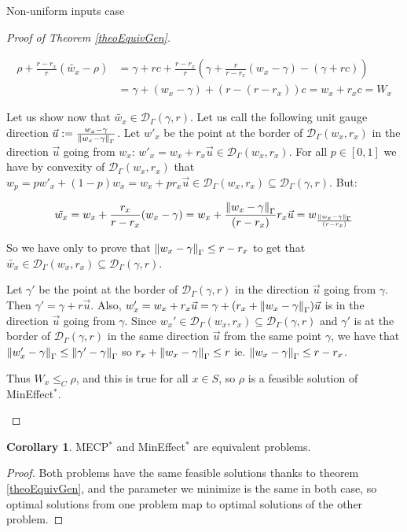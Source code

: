 \documentclass{article}
\theoremstyle{definition}
\newtheorem{cor}[theo]{Corollary}
\theoremstyle{remark}
\begin{document}
\begin{subsubsection}{Non-uniform inputs case}
\begin{proof}[Proof of Theorem \ref{theoEquivGen}]
\begin{enumerate}
      \begin{equation}
        \begin{aligned}
          \rho+ \frac{r-r_x}{r}(\tilde{w_x}-\rho) &=\gamma+ rc + \frac{r-r_x}{r}(\gamma + \frac{r}{r-r_x}(w_x-\gamma) - (\gamma + rc))\\
          &=\gamma+(w_x-\gamma) + (r-(r-r_x))c = w_x + r_xc = W_x
        \end{aligned}
      \end{equation}
      
      
      Let us show now that $\tilde{w_x} \in \mathcal{D}_{\Gamma}(\gamma,r)$. Let us call the following unit gauge direction $\vec{u} := \frac{w_x-\gamma}{\norm{w_x-\gamma}_{\Gamma}}$. Let $w'_x$ be the point at the border of $\mathcal{D}_{\Gamma}(w_x,r_x)$ in the direction $\vec{u}$ going from $w_x$: $w'_x= w_x + r_x\vec{u} \in \mathcal{D}_{\Gamma}(w_x,r_x)$. For all $p \in [0,1]$ we have by convexity of $\mathcal{D}_{\Gamma}(w_x,r_x)$ that $w_p = pw'_x + (1-p)w_x = w_x+pr_x\vec{u} \in \mathcal{D}_{\Gamma}(w_x,r_x) \subseteq \mathcal{D}_{\Gamma}(\gamma,r)$. But:
      
      \[ \tilde{w_x} = w_x + \frac{r_x}{r-r_x}(w_x-\gamma) = w_x + \frac{\norm{w_x-\gamma}_{\Gamma}}{(r-r_x)}r_x\vec{u} = w_{\frac{\norm{w_x-\gamma}_{\Gamma}}{(r-r_x)}} \]
      
      So we have only to prove that $\norm{w_x-\gamma}_{\Gamma} \leq r-r_x$ to get that $\tilde{w_x} \in \mathcal{D}_{\Gamma}(w_x,r_x) \subseteq \mathcal{D}_{\Gamma}(\gamma,r)$.
      
      Let $\gamma'$ be the point at the border of $\mathcal{D}_{\Gamma}(\gamma,r)$ in the direction $\vec{u}$ going from $\gamma$. Then $\gamma' = \gamma+r\vec{u}$. Also, $w_x' = w_x + r_x\vec{u} = \gamma + (r_x+\norm{w_x-\gamma}_{\Gamma})\vec{u}$ is in the direction $\vec{u}$ going from $\gamma$. Since $w_x' \in \mathcal{D}_{\Gamma}(w_x,r_x) \subseteq \mathcal{D}_{\Gamma}(\gamma,r)$ and $\gamma'$ is at the border of $\mathcal{D}_{\Gamma}(\gamma,r)$ in the same direction $\vec{u}$ from the same point $\gamma$, we have that $\norm{w_x' - \gamma}_{\Gamma} \leq \norm{\gamma'-\gamma}_{\Gamma}$ so $r_x+\norm{w_x-\gamma}_{\Gamma} \leq r$ ie. $\norm{w_x-\gamma}_{\Gamma} \leq r-r_x$.
      
      Thus $W_x \leq_C \rho$, and this is true for all $x \in S$, so $\rho$ is a feasible solution of MinEffect$^*$.
    \end{enumerate}
  \end{proof}
  
  \begin{cor}
    MECP$^*$ and MinEffect$^*$ are equivalent problems.
  \end{cor}
  
  \begin{proof}
    Both problems have the same feasible solutions thanks to theorem \ref{theoEquivGen}, and the parameter we minimize is the same in both case, so optimal solutions from one problem map to optimal solutions of the other problem.
  \end{proof}
\end{subsubsection}
\end{document}
